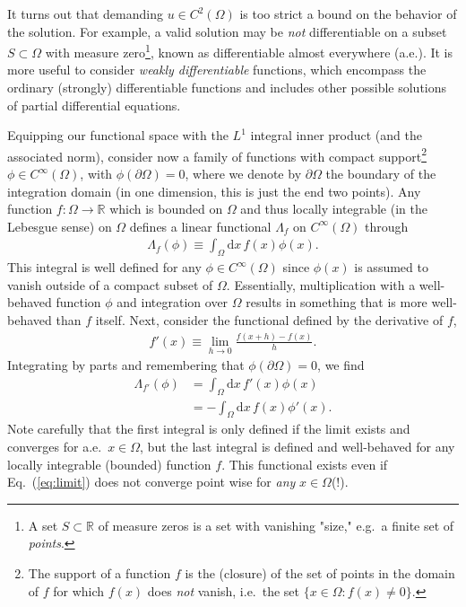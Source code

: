 \documentclass[a4paper, twocolumn]{article}
\newcommand{\eq} [1]{Eq.\ (\ref{eq:#1})}
\begin{document}
It turns out that demanding $u\in C^2(\Omega)$ is too strict a bound on the behavior of the solution. For example, a valid solution may be \textit{not} differentiable on a subset $S\subset\Omega$ with measure zero\footnote{A set $S\subset\mathds{R}$ of measure zeros is a set with vanishing "size," e.g.\ a finite set of \textit{points}.}, known as differentiable almost everywhere (a.e.). It is more useful to consider \textit{weakly differentiable} functions, which encompass the ordinary (strongly) differentiable functions and includes other possible solutions of partial differential equations. 

Equipping our functional space with the $L^1$ integral inner product (and the associated norm), consider now a family of functions with compact support\footnote{The support of a function $f$ is the (closure) of the set of points in the domain of $f$ for which $f(x)$ does \textit{not} vanish, i.e.\ the set $\{x\in\Omega:f(x)\not=0\}$.} $\phi\in C^\infty(\Omega)$, with $\phi(\partial\Omega)=0$, where we denote by $\partial\Omega$ the boundary of the integration domain (in one dimension, this is just the end two points). Any function $f:\Omega\rightarrow\mathds{R}$ which is bounded on $\Omega$ and thus locally integrable (in the Lebesgue sense) on $\Omega$ defines a linear functional $\Lambda_f$ on $C^\infty(\Omega)$ through
\begin{align}
\Lambda_f(\phi)\equiv \int_\Omega\mathrm{d}x\, f(x)\phi(x).
\end{align}
This integral is well defined for any $\phi\in C^\infty(\Omega)$ since $\phi(x)$ is assumed to vanish outside of a compact subset of $\Omega$. Essentially, multiplication with a well-behaved function $\phi$ and integration over $\Omega$ results in something that is more well-behaved than $f$ itself. Next, consider the functional defined by the derivative of $f$, 
\begin{align}
f'(x)\equiv \lim_{h\rightarrow0}\frac{f(x+h)-f(x)}{h}. \label{eq:limit}
\end{align}
Integrating by parts and remembering that $\phi(\partial \Omega)=0$, we find
\begin{align}
\Lambda_{f'}(\phi) &=  \int_\Omega\mathrm{d}x\, f'(x)\phi(x) \nonumber \\
%
&=  -\int_\Omega\mathrm{d}x\, f(x)\phi'(x).
\end{align}
Note carefully that the first integral is only defined if the limit exists and converges for a.e.\ $x\in\Omega$, but the last integral is defined and well-behaved for any locally integrable (bounded) function $f$. This functional exists even if \eq{limit} does not converge point wise for \textit{any} $x\in\Omega$(!).
\end{document}
